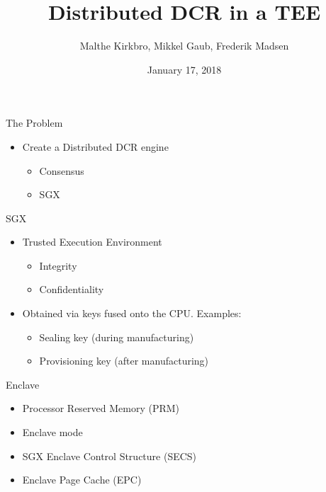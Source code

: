 \documentclass{beamer}
\title{Distributed DCR in a TEE}
\author{Malthe Kirkbro, Mikkel Gaub, Frederik Madsen}
\date{January 17, 2018}
\begin{document}


	\begin{frame}
		\maketitle
	\end{frame}

	\begin{frame}{The Problem} %
		\begin{itemize}
			\item Create a Distributed DCR engine
			\begin{itemize}
				\item Consensus
				\item SGX
			\end{itemize}
		\end{itemize}
	\end{frame}

	\begin{frame}{SGX} %
		\begin{itemize}
			\item Trusted Execution Environment
			\begin{itemize}
				\item Integrity
				\item Confidentiality
			\end{itemize}
			\item Obtained via keys fused onto the CPU. Examples:
			\begin{itemize}
				\item Sealing key (during manufacturing)
				\item Provisioning key (after manufacturing)
			\end{itemize}
		\end{itemize}
	\end{frame}

	\begin{frame}{Enclave} %
		\begin{itemize}
			\item Processor Reserved Memory (PRM)
			\item Enclave mode
			\item SGX Enclave Control Structure (SECS)
			\item Enclave Page Cache (EPC)
		\end{itemize}
	\end{frame}
\end{document}
